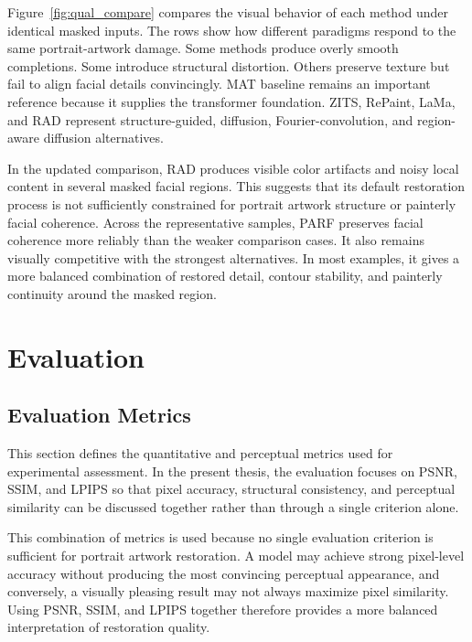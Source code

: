 \documentclass[12pt, twoside]{report}
\begin{document}
Figure~\ref{fig:qual_compare} compares the visual behavior of each method under identical masked inputs. The rows show how different paradigms respond to the same portrait-artwork damage. Some methods produce overly smooth completions. Some introduce structural distortion. Others preserve texture but fail to align facial details convincingly. MAT baseline remains an important reference because it supplies the transformer foundation. ZITS, RePaint, LaMa, and RAD represent structure-guided, diffusion, Fourier-convolution, and region-aware diffusion alternatives.

In the updated comparison, RAD produces visible color artifacts and noisy local content in several masked facial regions. This suggests that its default restoration process is not sufficiently constrained for portrait artwork structure or painterly facial coherence. Across the representative samples, PARF preserves facial coherence more reliably than the weaker comparison cases. It also remains visually competitive with the strongest alternatives. In most examples, it gives a more balanced combination of restored detail, contour stability, and painterly continuity around the masked region.

\section{Evaluation}

\subsection{Evaluation Metrics}

This section defines the quantitative and perceptual metrics used for experimental assessment. In the present thesis, the evaluation focuses on PSNR, SSIM, and LPIPS so that pixel accuracy, structural consistency, and perceptual similarity can be discussed together rather than through a single criterion alone.

This combination of metrics is used because no single evaluation criterion is sufficient for portrait artwork restoration. A model may achieve strong pixel-level accuracy without producing the most convincing perceptual appearance, and conversely, a visually pleasing result may not always maximize pixel similarity. Using PSNR, SSIM, and LPIPS together therefore provides a more balanced interpretation of restoration quality.
\end{document}
